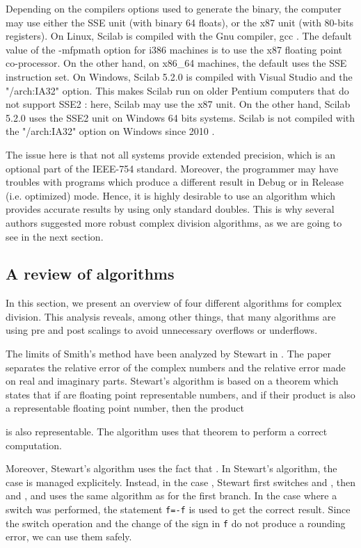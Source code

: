\documentclass{paper}
\newcommand{\scivar}[1]{\texttt{#1}}
\begin{document}
Depending on the compilers options used to generate the binary,
the computer may use either the SSE unit (with binary 64 floats), or the 
x87 unit (with 80-bits registers). 
On Linux, Scilab is compiled with the Gnu compiler, gcc \cite{GCCManual2008}.  
The default value of the -mfpmath option for i386 machines 
is to use the x87 floating point co-processor. 
On the other hand, on x86\_64 machines, the default uses the SSE instruction set. 
On Windows, Scilab 5.2.0 is compiled with Visual Studio and the "/arch:IA32" option. 
This makes Scilab run on older Pentium computers that do not support 
SSE2 \cite{CordenKreitzerIntel2009}: here, Scilab may use the x87 unit. 
On the other hand, Scilab 5.2.0 uses the SSE2 unit on Windows 64 bits systems. 
Scilab is not compiled with the "/arch:IA32" option on Windows since 
2010 \cite{CornetARCHIA322010}.

The issue here is that not all systems provide extended precision, which is an 
optional part of the IEEE-754 standard. 
Moreover, the programmer may have troubles with programs which 
produce a different result in Debug or in Release (i.e. optimized) mode. 
Hence, it is highly desirable to use an algorithm which provides accurate results 
by using only standard doubles. 
This is why several authors suggested more robust complex division algorithms, as 
we are going to see in the next section.


\subsection{A review of algorithms}

In this section, we present an overview of four different algorithms 
for complex division. 
This analysis reveals, among other things, that many algorithms 
are using pre and post scalings to avoid unnecessary overflows or underflows. 

The limits of Smith's method have been analyzed by Stewart in \cite{214414}.
The paper separates the relative error of the complex numbers and the relative
error made on real and imaginary parts. 
Stewart's algorithm is based on a theorem which states that if 
are  floating point representable numbers, and if their product is also 
a representable floating point number, then the product 

is also representable. 
The algorithm uses that theorem to perform a correct computation. 

Moreover, Stewart's algorithm uses the fact that . 
In Stewart's algorithm, the case  is managed explicitely. 
Instead, in the case , Stewart first switches  and , then  and , 
and uses the same algorithm as for the first branch. 
In the case where a switch was performed, the statement \scivar{f=-f} is used 
to get the correct result. 
Since the switch operation and the change of the sign in \scivar{f} 
do not produce a rounding error, we can use them safely. 
\end{document}
